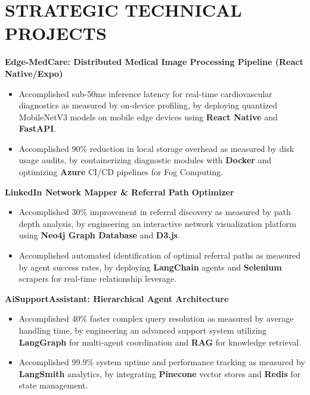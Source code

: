 \documentclass[10pt, a4paper]{article}
\begin{document}
\section{STRATEGIC TECHNICAL PROJECTS}

\textbf{Edge-MedCare: Distributed Medical Image Processing Pipeline (React Native/Expo)}
\begin{itemize}
    \item Accomplished sub-50ms inference latency for real-time cardiovascular diagnostics as measured by on-device profiling, by deploying quantized MobileNetV3 models on mobile edge devices using \textbf{React Native} and \textbf{FastAPI}.
    \item Accomplished 90\% reduction in local storage overhead as measured by disk usage audits, by containerizing diagnostic modules with \textbf{Docker} and optimizing \textbf{Azure} CI/CD pipelines for Fog Computing.
\end{itemize}

\vspace{4pt}
\textbf{LinkedIn Network Mapper \& Referral Path Optimizer}
\begin{itemize}
    \item Accomplished 30\% improvement in referral discovery as measured by path depth analysis, by engineering an interactive network visualization platform using \textbf{Neo4j Graph Database} and \textbf{D3.js}.
    \item Accomplished automated identification of optimal referral paths as measured by agent success rates, by deploying \textbf{LangChain} agents and \textbf{Selenium} scrapers for real-time relationship leverage.
\end{itemize}

\vspace{4pt}
\textbf{AiSupportAssistant: Hierarchical Agent Architecture}
\begin{itemize}
    \item Accomplished 40\% faster complex query resolution as measured by average handling time, by engineering an advanced support system utilizing \textbf{LangGraph} for multi-agent coordination and \textbf{RAG} for knowledge retrieval.
    \item Accomplished 99.9\% system uptime and performance tracking as measured by \textbf{LangSmith} analytics, by integrating \textbf{Pinecone} vector stores and \textbf{Redis} for state management.
\end{itemize}
\end{document}

